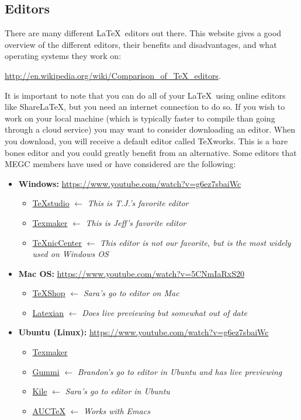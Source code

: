 \documentclass[]{article}%
\theoremstyle{definition}
\begin{document}
	\subsection{Editors}
	There are many different \LaTeX\ editors out there.
	This website gives a good overview of the different editors, their benefits and disadvantages, and what operating systems they work on:
	\begin{center}
		\url{http://en.wikipedia.org/wiki/Comparison_of_TeX_editors}.
	\end{center}
	It is important to note that you can do all of your \LaTeX\ using online editors like ShareLaTeX, but you need an internet connection to do so.
	If you wish to work on your local machine (which is typically faster to compile than going through a cloud service) you may want to consider downloading an editor.
	When you download, you will receive a default editor called TeXworks.
	This is a bare bones editor and you could greatly benefit from an alternative.
	Some editors that MEGC members have used or have considered are the following:
	\begin{itemize}
		\item \textbf{Windows:} \url{https://www.youtube.com/watch?v=g6ez7sbaiWc}
		\begin{itemize}
			\item \href{http://www.texstudio.org/}{TeXstudio} $\leftarrow$ \emph{This is T.J.'s favorite editor}
			\item \href{http://www.xm1math.net/texmaker/}{Texmaker} $\leftarrow$ \emph{This is Jeff's favorite editor}
			\item \href{http://www.texniccenter.org/}{TeXnicCenter} $\leftarrow$ \emph{This editor is not our favorite, but is the most widely used on Windows OS}
		\end{itemize}
		\item \textbf{Mac OS:} \url{https://www.youtube.com/watch?v=5CNmIaRxS20}
		\begin{itemize}
			\item \href{http://pages.uoregon.edu/koch/texshop/}{TeXShop} $\leftarrow$ \emph{Sara's go to editor on Mac}
			\item \href{http://tacosw.com/latexian/download.php}{Latexian} $\leftarrow$ \emph{Does live previewing but somewhat out of date}
		\end{itemize}
		\item \textbf{Ubuntu (Linux):} \url{https://www.youtube.com/watch?v=g6ez7sbaiWc}
		\begin{itemize}
			\item \href{https://apps.ubuntu.com/cat/applications/texmaker/}{Texmaker}
			\item \href{https://apps.ubuntu.com/cat/applications/precise/gummi/}{Gummi} $\leftarrow$ \emph{Brandon's go to editor in Ubuntu and has live previewing}
			\item \href{https://apps.ubuntu.com/cat/applications/kile/}{Kile} $\leftarrow$ \emph{Sara's go to editor in Ubuntu}
			\item \href{https://www.gnu.org/software/auctex/}{AUCTeX} $\leftarrow$ \emph{Works with Emacs}
		\end{itemize}
	\end{itemize}
	
\end{document}
